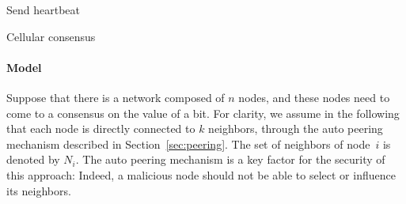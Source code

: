 \documentclass[../main.tex]{subfiles}
\begin{document}
\begin{algorithm}[h]
	\DontPrintSemicolon
			
	\caption{Send heartbeat}
	\label{alg:heartbeat}
\end{algorithm}

\begin{algorithm}[h]
	\DontPrintSemicolon
			
	\BlankLine
			
	\caption{Cellular consensus}
	\label{alg:cell}
\end{algorithm}

\paragraph{Model}

Suppose that there is a network composed of $n$ nodes, and these nodes need to come to a consensus on the value of a bit.
For clarity, we assume in the following that each node is directly connected to $k$ neighbors, through the auto peering mechanism described in Section~\ref{sec:peering}.
The set of neighbors of node~$i$ is denoted by $N_i$.
The auto peering mechanism is a key factor for the security of this approach: Indeed, a malicious node should not be able to select or influence its neighbors.
\end{document}
